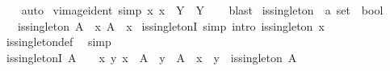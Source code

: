 \begin{isabellebody}
%
\isadelimproof
\ \ %
\endisadelimproof
%
\isatagproof
{}\isamarkupfalse%
\ auto%
\endisatagproof
{\isafoldproof}%
%
\isadelimproof
\isanewline
%
\endisadelimproof
\isanewline
{}\isamarkupfalse%
\ vimage{\isacharunderscore}{\kern0pt}ident\ {\isacharbrackleft}{\kern0pt}simp{\isacharbrackright}{\kern0pt}{\isacharcolon}{\kern0pt}\ {\isachardoublequoteopen}{\isacharparenleft}{\kern0pt}{\isasymlambda}x{\isachardot}{\kern0pt}\ x{\isacharparenright}{\kern0pt}\ {\isacharminus}{\kern0pt}{\isacharbackquote}{\kern0pt}\ Y\ {\isacharequal}{\kern0pt}\ Y{\isachardoublequoteclose}\isanewline
%
\isadelimproof
\ \ %
\endisadelimproof
%
\isatagproof
{}\isamarkupfalse%
\ blast%
\endisatagproof
{\isafoldproof}%
%
\isadelimproof
%
\endisadelimproof
%
\isadelimdocument
%
\endisadelimdocument
%
\isatagdocument
%
\isamarkuptrue%
%
\endisatagdocument
{\isafolddocument}%
%
\isadelimdocument
%
\endisadelimdocument
{}\isamarkupfalse%
\ is{\isacharunderscore}{\kern0pt}singleton\ {\isacharcolon}{\kern0pt}{\isacharcolon}{\kern0pt}\ {\isachardoublequoteopen}{\isacharprime}{\kern0pt}a\ set\ {\isasymRightarrow}\ bool{\isachardoublequoteclose}\isanewline
\ \ \ {\isachardoublequoteopen}is{\isacharunderscore}{\kern0pt}singleton\ A\ {\isasymlongleftrightarrow}\ {\isacharparenleft}{\kern0pt}{\isasymexists}x{\isachardot}{\kern0pt}\ A\ {\isacharequal}{\kern0pt}\ {\isacharbraceleft}{\kern0pt}x{\isacharbraceright}{\kern0pt}{\isacharparenright}{\kern0pt}{\isachardoublequoteclose}\isanewline
\isanewline
{}\isamarkupfalse%
\ is{\isacharunderscore}{\kern0pt}singletonI\ {\isacharbrackleft}{\kern0pt}simp{\isacharcomma}{\kern0pt}\ intro{\isacharbang}{\kern0pt}{\isacharbrackright}{\kern0pt}{\isacharcolon}{\kern0pt}\ {\isachardoublequoteopen}is{\isacharunderscore}{\kern0pt}singleton\ {\isacharbraceleft}{\kern0pt}x{\isacharbraceright}{\kern0pt}{\isachardoublequoteclose}\isanewline
%
\isadelimproof
\ \ %
\endisadelimproof
%
\isatagproof
{}\isamarkupfalse%
\ is{\isacharunderscore}{\kern0pt}singleton{\isacharunderscore}{\kern0pt}def\ \isamarkupfalse%
\ simp%
\endisatagproof
{\isafoldproof}%
%
\isadelimproof
\isanewline
%
\endisadelimproof
\isanewline
{}\isamarkupfalse%
\ is{\isacharunderscore}{\kern0pt}singletonI{\isacharprime}{\kern0pt}{\isacharcolon}{\kern0pt}\ {\isachardoublequoteopen}A\ {\isasymnoteq}\ {\isacharbraceleft}{\kern0pt}{\isacharbraceright}{\kern0pt}\ {\isasymLongrightarrow}\ {\isacharparenleft}{\kern0pt}{\isasymAnd}x\ y{\isachardot}{\kern0pt}\ x\ {\isasymin}\ A\ {\isasymLongrightarrow}\ y\ {\isasymin}\ A\ {\isasymLongrightarrow}\ x\ {\isacharequal}{\kern0pt}\ y{\isacharparenright}{\kern0pt}\ {\isasymLongrightarrow}\ is{\isacharunderscore}{\kern0pt}singleton\ A{\isachardoublequoteclose}\isanewline

\end{isabellebody}
